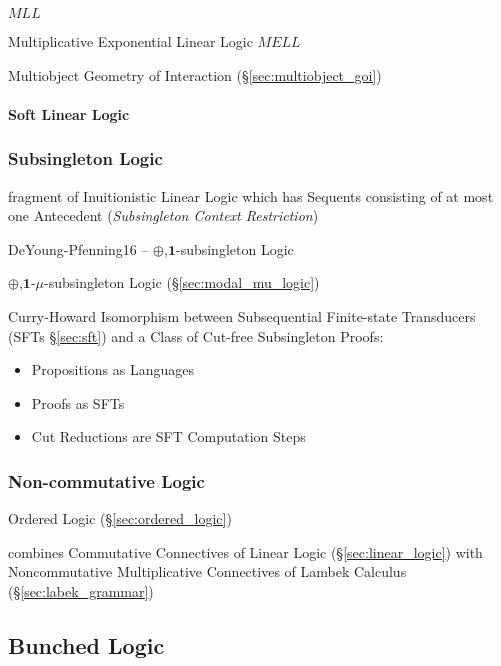 \cite{haghverdi-scott05}

$MLL$

Multiplicative Exponential Linear Logic $MELL$

Multiobject Geometry of Interaction (\S\ref{sec:multiobject_goi})



\paragraph{Soft Linear Logic}\label{sec:soft_linear_logic}\hfill



\subsubsection{Subsingleton Logic}\label{sec:subsingleton_logic}

fragment of Inuitionistic Linear Logic which has Sequents consisting
of at most one Antecedent (\emph{Subsingleton Context Restriction})

DeYoung-Pfenning16 -- $\oplus$,$\mathbf{1}$-subsingleton Logic

\fist $\oplus$,$\mathbf{1}$-$\mu$-subsingleton Logic
(\S\ref{sec:modal_mu_logic})

Curry-Howard Isomorphism between Subsequential Finite-state
Transducers (SFTs \S\ref{sec:sft}) and a Class of Cut-free
Subsingleton Proofs:
\begin{itemize}
  \item Propositions as Languages
  \item Proofs as SFTs
  \item Cut Reductions are SFT Computation Steps
\end{itemize}



\subsubsection{Non-commutative Logic}\label{sec:noncommutative_logic}
\hfill

\fist Ordered Logic (\S\ref{sec:ordered_logic})

combines Commutative Connectives of Linear Logic
(\S\ref{sec:linear_logic}) with Noncommutative Multiplicative
Connectives of Lambek Calculus (\S\ref{sec:labek_grammar})



\subsection{Bunched Logic}\label{sec:bunched_logic}

